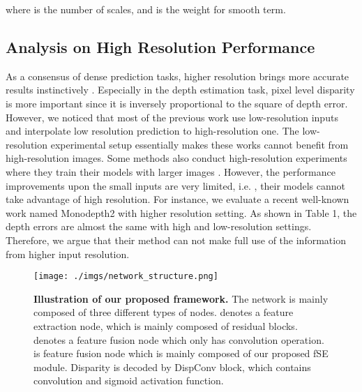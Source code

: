 \documentclass[letterpaper]{article} \usepackage{aaai21}  \usepackage{times}  \usepackage{helvet} \usepackage{courier}  \usepackage[hyphens]{url}  \usepackage{graphicx} \urlstyle{rm} \def\UrlFont{\rm}  \usepackage{natbib}  \usepackage{caption} \frenchspacing  \setlength{\pdfpagewidth}{8.5in}  \setlength{\pdfpageheight}{11in}  \usepackage{booktabs}
\begin{document}
where  is the number of scales, and  is the weight for smooth term.

\subsection{Analysis on High Resolution Performance}
As a consensus of dense prediction tasks, higher resolution brings more accurate results instinctively \cite{Sun_2019_CVPR, zhou2019unsupervised}. Especially in the depth estimation task, pixel level disparity is more important since 
it is inversely proportional to the square of depth error\cite{you2019pseudo}. However, we noticed that most of the previous work use low-resolution inputs and interpolate low 
resolution prediction to high-resolution one. The low-resolution experimental setup essentially makes these works cannot benefit from high-resolution images. Some methods also 
conduct high-resolution experiments where they train their models with larger images \cite{godard2019digging, superdepth}. However, the performance improvements upon the small 
inputs are very limited, i.e. \cite{superdepth}, their models cannot take advantage of high resolution. For instance, we evaluate a recent well-known work named 
Monodepth2\cite{godard2019digging} with higher resolution setting. As shown in Table 1, the depth errors are almost the same with high and low-resolution settings. 
Therefore, we argue that their method can not make full use of the information from higher input resolution.

\begin{figure*}[ht]
    \centering
    \texttt{[image: ./imgs/network\_structure.png]} 
    \caption{\textbf{Illustration of our proposed framework.} The network is mainly composed of three different types of nodes.  denotes a feature extraction node, which is mainly composed
    of residual blocks.  denotes a feature fusion node which only has  convolution operation.  is feature fusion node which is mainly composed of our proposed fSE module. Disparity is decoded
    by DispConv block, which contains  convolution and sigmoid activation function. }
\label{fig3}
\end{figure*}
\begin{table}[ht]
    \caption{\textbf{Quantitative results from Monodepth2 with different resolution setting training and testing.}}
    \label{tab:1}
\end{table}
\end{document}
